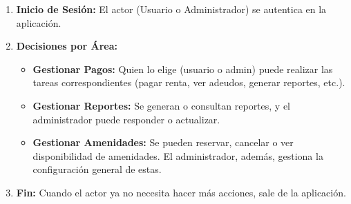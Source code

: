 \documentclass[protocolo.tex]{subfiles}
\begin{document}
\begin{enumerate}
    \item \textbf{Inicio de Sesión:}  
    El actor (Usuario o Administrador) se autentica en la aplicación.
    \item \textbf{Decisiones por Área:} 
    \begin{itemize}
        \item \textbf{Gestionar Pagos:}  Quien lo elige (usuario o admin) puede realizar las tareas correspondientes (pagar renta, ver adeudos, generar reportes, etc.).
        \item \textbf{Gestionar Reportes:}  Se generan o consultan reportes, y el administrador puede responder o actualizar.
        \item \textbf{Gestionar Amenidades:}  Se pueden reservar, cancelar o ver disponibilidad de amenidades. El administrador, además, gestiona la configuración general de estas.
    \end{itemize} 
    
    \item \textbf{Fin:}  
    Cuando el actor ya no necesita hacer más acciones, sale de la aplicación.
    
\end{enumerate}
\end{document}
